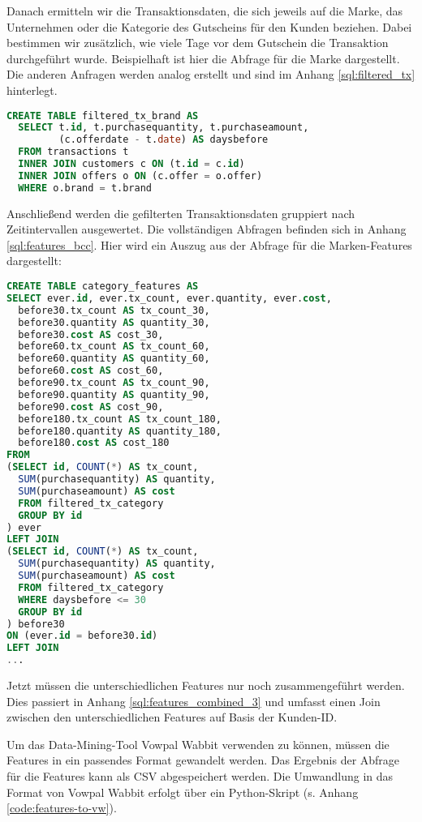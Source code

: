 Danach ermitteln wir die Transaktionsdaten, die sich jeweils auf die Marke, das Unternehmen oder 
die Kategorie des Gutscheins für den Kunden beziehen. Dabei bestimmen wir zusätzlich, wie viele
Tage vor dem Gutschein die Transaktion durchgeführt wurde. Beispielhaft ist hier die Abfrage
für die Marke dargestellt. Die anderen Anfragen werden analog erstellt und sind im Anhang
\ref{sql:filtered_tx} hinterlegt.
\begin{lstlisting}[language=SQL]
CREATE TABLE filtered_tx_brand AS
  SELECT t.id, t.purchasequantity, t.purchaseamount, 
         (c.offerdate - t.date) AS daysbefore 
  FROM transactions t 
  INNER JOIN customers c ON (t.id = c.id)
  INNER JOIN offers o ON (c.offer = o.offer)
  WHERE o.brand = t.brand
\end{lstlisting}

Anschließend werden die gefilterten Transaktionsdaten gruppiert nach
Zeitintervallen ausgewertet. Die vollständigen Abfragen befinden sich
in Anhang \ref{sql:features_bcc}. Hier wird ein Auszug aus der
Abfrage für die Marken-Features dargestellt:
\begin{lstlisting}[language=SQL]
CREATE TABLE category_features AS
SELECT ever.id, ever.tx_count, ever.quantity, ever.cost,
  before30.tx_count AS tx_count_30,
  before30.quantity AS quantity_30,
  before30.cost AS cost_30,
  before60.tx_count AS tx_count_60,
  before60.quantity AS quantity_60,
  before60.cost AS cost_60,
  before90.tx_count AS tx_count_90,
  before90.quantity AS quantity_90,
  before90.cost AS cost_90,
  before180.tx_count AS tx_count_180,
  before180.quantity AS quantity_180,
  before180.cost AS cost_180
FROM 
(SELECT id, COUNT(*) AS tx_count, 
  SUM(purchasequantity) AS quantity, 
  SUM(purchaseamount) AS cost
  FROM filtered_tx_category
  GROUP BY id
) ever
LEFT JOIN
(SELECT id, COUNT(*) AS tx_count, 
  SUM(purchasequantity) AS quantity, 
  SUM(purchaseamount) AS cost
  FROM filtered_tx_category
  WHERE daysbefore <= 30
  GROUP BY id
) before30
ON (ever.id = before30.id)
LEFT JOIN
...
\end{lstlisting}

Jetzt müssen die unterschiedlichen Features nur noch zusammengeführt werden. Dies passiert
in Anhang \ref{sql:features_combined_3} und umfasst einen Join zwischen den
unterschiedlichen Features auf Basis der Kunden-ID.

Um das Data-Mining-Tool Vowpal Wabbit verwenden zu können, müssen die Features in ein
passendes Format gewandelt werden. Das Ergebnis der Abfrage für die Features kann
als CSV abgespeichert werden. Die Umwandlung in das Format von Vowpal Wabbit
erfolgt über ein Python-Skript (s. Anhang \ref{code:features-to-vw}).

